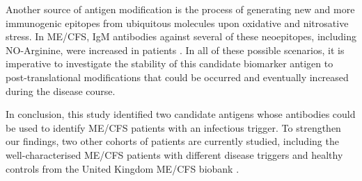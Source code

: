 Another source of antigen modification is the process of generating new and more immunogenic epitopes from ubiquitous molecules upon oxidative and nitrosative stress. In ME/CFS, IgM antibodies against several of these neoepitopes, including NO-Arginine, were increased in patients \citep{maes2006ChronicFatigue}. In all of these possible scenarios, it is imperative to investigate the stability of this candidate biomarker antigen to post-translational modifications that could be occurred and eventually increased during the disease course.

In conclusion, this study identified two candidate antigens whose antibodies could be used to identify ME/CFS patients with an infectious trigger. To strengthen our findings, two other cohorts of patients are currently studied, including the well-characterised ME/CFS patients with different disease triggers and healthy controls from the United Kingdom ME/CFS biobank \citep{domingues2021HerpesvirusesSerologya}.





